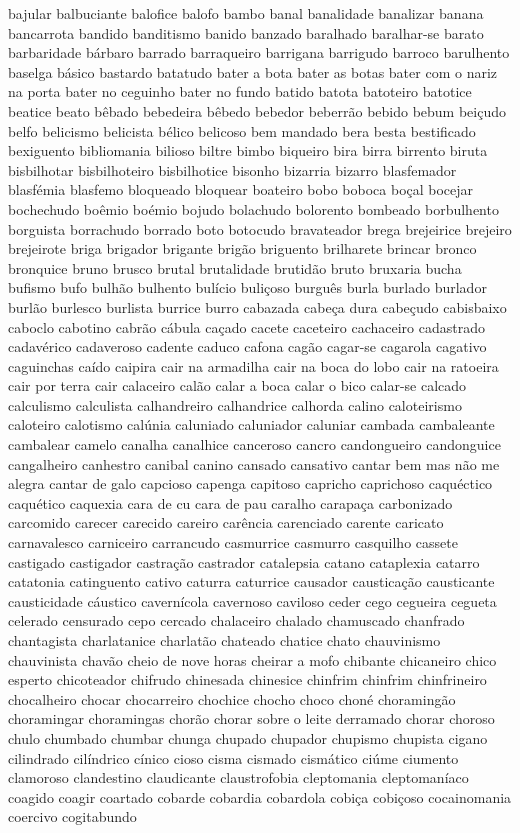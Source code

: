 \documentclass[ruledheader]{abnt_UFF}
\begin{document}
bajular balbuciante balofice balofo bambo banal banalidade banalizar banana bancarrota bandido banditismo banido banzado baralhado baralhar-se barato barbaridade b\'{a}rbaro barrado barraqueiro barrigana barrigudo barroco barulhento baselga b\'{a}sico bastardo batatudo bater a bota bater as botas bater com o nariz na porta bater no ceguinho bater no fundo batido batota batoteiro batotice beatice beato b\^{e}bado bebedeira b\^{e}bedo bebedor beberr\~ao bebido bebum bei\c{c}udo belfo belicismo belicista b\'{e}lico belicoso bem mandado bera besta bestificado bexiguento bibliomania bilioso biltre bimbo biqueiro bira birra birrento biruta bisbilhotar bisbilhoteiro bisbilhotice bisonho bizarria bizarro blasfemador blasf\'{e}mia blasfemo bloqueado bloquear boateiro bobo boboca bo\c{c}al bocejar bochechudo bo\^{e}mio bo\'{e}mio bojudo bolachudo bolorento bombeado borbulhento borguista borrachudo borrado boto botocudo bravateador brega brejeirice brejeiro brejeirote briga brigador brigante brig\~ao briguento brilharete brincar bronco bronquice bruno brusco brutal brutalidade brutid\~ao bruto bruxaria bucha bufismo bufo bulh\~ao bulhento bul\'{i}cio buli\c{c}oso burgu\^{e}s burla burlado burlador burl\~ao burlesco burlista burrice burro cabazada cabe\c{c}a dura cabe\c{c}udo cabisbaixo caboclo cabotino cabr\~ao c\'{a}bula ca\c{c}ado cacete caceteiro cachaceiro cadastrado cadav\'{e}rico cadaveroso cadente caduco cafona cag\~ao cagar-se cagarola cagativo caguinchas ca\'{i}do caipira cair na armadilha cair na boca do lobo cair na ratoeira cair por terra cair calaceiro cal\~ao calar a boca calar o bico calar-se calcado calculismo calculista calhandreiro calhandrice calhorda calino caloteirismo caloteiro calotismo cal\'{u}nia caluniado caluniador caluniar cambada cambaleante cambalear camelo canalha canalhice canceroso cancro candongueiro candonguice cangalheiro canhestro canibal canino cansado cansativo cantar bem mas n\~ao me alegra cantar de galo capcioso capenga capitoso capricho caprichoso caqu\'{e}ctico caqu\'{e}tico caquexia cara de cu cara de pau caralho carapa\c{c}a carbonizado carcomido carecer carecido careiro car\^{e}ncia carenciado carente caricato carnavalesco carniceiro carrancudo casmurrice casmurro casquilho cassete castigado castigador castra\c{c}\~ao castrador catalepsia catano cataplexia catarro catatonia catinguento cativo caturra caturrice causador caustica\c{c}\~ao causticante causticidade c\'{a}ustico cavern\'{i}cola cavernoso caviloso ceder cego cegueira cegueta celerado censurado cepo cercado chalaceiro chalado chamuscado chanfrado chantagista charlatanice charlat\~ao chateado chatice chato chauvinismo chauvinista chav\~ao cheio de nove horas cheirar a mofo chibante chicaneiro chico esperto chicoteador chifrudo chinesada chinesice chinfrim chinfrim chinfrineiro chocalheiro chocar chocarreiro chochice chocho choco chon\'{e} choraming\~ao choramingar choramingas chor\~ao chorar sobre o leite derramado chorar choroso chulo chumbado chumbar chunga chupado chupador chupismo chupista cigano cilindrado cil\'{i}ndrico c\'{i}nico cioso cisma cismado cism\'{a}tico ci\'{u}me ciumento clamoroso clandestino claudicante claustrofobia cleptomania cleptoman\'{i}aco coagido coagir coartado cobarde cobardia cobardola cobi\c{c}a cobi\c{c}oso cocainomania coercivo cogitabundo 
\end{document}
